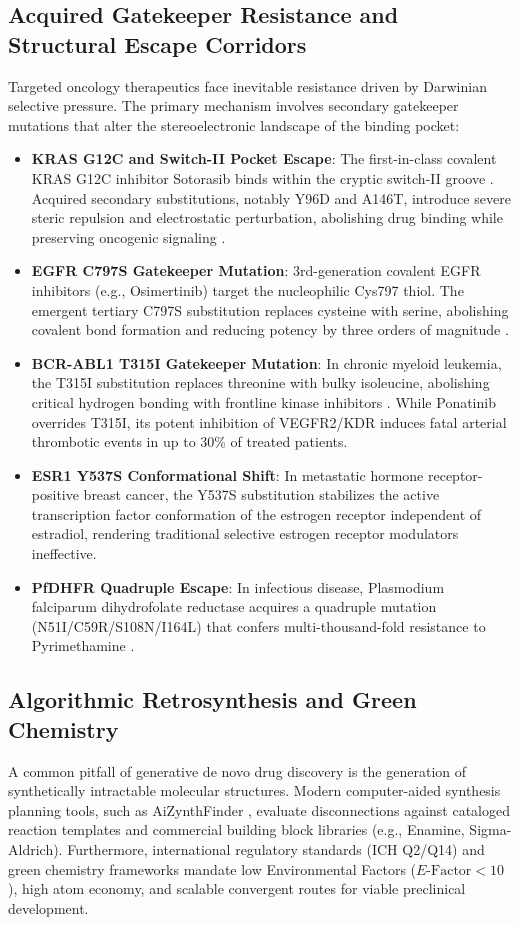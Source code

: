 \subsection{Acquired Gatekeeper Resistance and Structural Escape Corridors}
Targeted oncology therapeutics face inevitable resistance driven by Darwinian selective pressure. The primary mechanism involves secondary gatekeeper mutations that alter the stereoelectronic landscape of the binding pocket:
\begin{itemize}
    \item \textbf{KRAS G12C and Switch-II Pocket Escape}: The first-in-class covalent KRAS G12C inhibitor Sotorasib binds within the cryptic switch-II groove \cite{ostrem2013kras,canon2019clinical}. Acquired secondary substitutions, notably Y96D and A146T, introduce severe steric repulsion and electrostatic perturbation, abolishing drug binding while preserving oncogenic signaling \cite{tanaka2021clinical}.
    \item \textbf{EGFR C797S Gatekeeper Mutation}: 3rd-generation covalent EGFR inhibitors (e.g., Osimertinib) target the nucleophilic Cys797 thiol. The emergent tertiary C797S substitution replaces cysteine with serine, abolishing covalent bond formation and reducing potency by three orders of magnitude \cite{thress2015acquired}.
    \item \textbf{BCR-ABL1 T315I Gatekeeper Mutation}: In chronic myeloid leukemia, the T315I substitution replaces threonine with bulky isoleucine, abolishing critical hydrogen bonding with frontline kinase inhibitors \cite{shah2004overriding}. While Ponatinib overrides T315I, its potent inhibition of VEGFR2/KDR induces fatal arterial thrombotic events in up to 30\% of treated patients.
    \item \textbf{ESR1 Y537S Conformational Shift}: In metastatic hormone receptor-positive breast cancer, the Y537S substitution stabilizes the active transcription factor conformation of the estrogen receptor independent of estradiol, rendering traditional selective estrogen receptor modulators ineffective.
    \item \textbf{PfDHFR Quadruple Escape}: In infectious disease, Plasmodium falciparum dihydrofolate reductase acquires a quadruple mutation (N51I/C59R/S108N/I164L) that confers multi-thousand-fold resistance to Pyrimethamine \cite{singh2011resurgence}.
\end{itemize}

\subsection{Algorithmic Retrosynthesis and Green Chemistry}
A common pitfall of generative de novo drug discovery is the generation of synthetically intractable molecular structures. Modern computer-aided synthesis planning tools, such as AiZynthFinder \cite{genheden2020aizynthfinder}, evaluate disconnections against cataloged reaction templates and commercial building block libraries (e.g., Enamine, Sigma-Aldrich). Furthermore, international regulatory standards (ICH Q2/Q14) and green chemistry frameworks mandate low Environmental Factors ($E\text{-Factor} < 10$), high atom economy, and scalable convergent routes for viable preclinical development.

